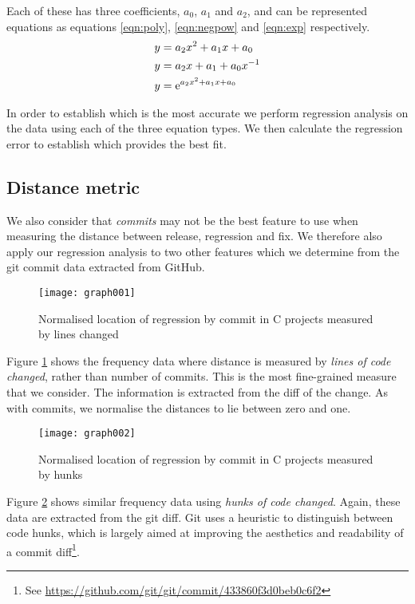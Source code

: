 \documentclass[10pt,journal,compsoc]{IEEEtran}
\begin{document}
Each of these has three coefficients, $a_0$, $a_1$ and $a_2$, and can be represented equations as equations \ref{eqn:poly}, \ref{eqn:negpow} and \ref{eqn:exp} respectively.
\begin{align}
y &= a_2 x^2 + a_1 x + a_0 \label{eqn:poly} \\
y &= a_2 x + a_1 + a_0 x^{-1} \label{eqn:negpow} \\
y &= \esup{a_2 x^2 + a_1 x + a_0} \label{eqn:exp}
\end{align}

In order to establish which is the most accurate we perform regression analysis on the data using each of the three equation types. We then calculate the regression error to establish which provides the best fit.

\subsection{Distance metric}

We also consider that {\it commits\/} may not be the best feature to use when measuring the distance between release, regression and fix. We therefore also apply our regression analysis to two other features which we determine from the git commit data extracted from GitHub.

\begin{figure}[t]
\centering
\texttt{[image: graph001]}%
\caption{\label{fig:c-lines}Normalised location of regression by commit in C projects measured by lines changed}
\end{figure}

Figure \ref{fig:c-lines} shows the frequency data where distance is measured by {\it lines of code changed}, rather than number of commits. This is the most fine-grained measure that we consider. The information is extracted from the diff of the change. As with commits, we normalise the distances to lie between zero and one.

\begin{figure}[t]
\centering
\texttt{[image: graph002]}%
\caption{\label{fig:c-blocks}Normalised location of regression by commit in C projects measured by hunks}
\end{figure}

Figure \ref{fig:c-blocks} shows similar frequency data using {\it hunks of code changed}. Again, these data are extracted from the git diff. Git uses a heuristic to distinguish between code hunks, which is largely aimed at improving the aesthetics and readability of a commit diff\footnote{See \url{https://github.com/git/git/commit/433860f3d0beb0c6f2}}.
\end{document}
